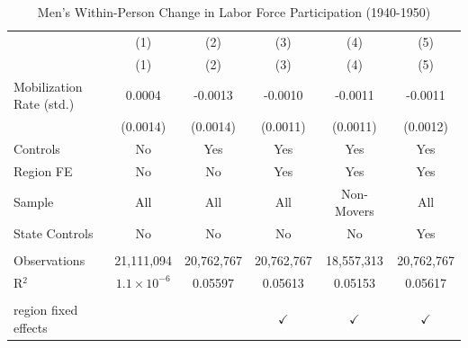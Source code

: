 
\begin{table}[htbp]
   \caption{\label{tab:men_main} Men's Within-Person Change in Labor Force Participation (1940-1950)}
   \bigskip
   \centering
   \begin{tabular}{lccccc}
      \toprule
                               & (1)                  & (2)        & (3)           & (4)           & (5) \\   
                               & (1)                  & (2)        & (3)           & (4)           & (5)\\  
      \midrule 
      Mobilization Rate (std.) & 0.0004               & -0.0013    & -0.0010       & -0.0011       & -0.0011\\   
                               & (0.0014)             & (0.0014)   & (0.0011)      & (0.0011)      & (0.0012)\\   
      Controls                 & No                   & Yes        & Yes           & Yes           & Yes\\  
      Region FE                & No                   & No         & Yes           & Yes           & Yes\\  
      Sample                   & All                  & All        & All           & Non-Movers    & All\\  
      State Controls           & No                   & No         & No            & No            & Yes\\  
       \\
      Observations             & 21,111,094           & 20,762,767 & 20,762,767    & 18,557,313    & 20,762,767\\  
      R$^2$                    & $1.1\times 10^{-6}$  & 0.05597    & 0.05613       & 0.05153       & 0.05617\\  
       \\
      region fixed effects     &                      &            & $\checkmark$  & $\checkmark$  & $\checkmark$\\   
      \bottomrule
   \end{tabular}
\end{table}


